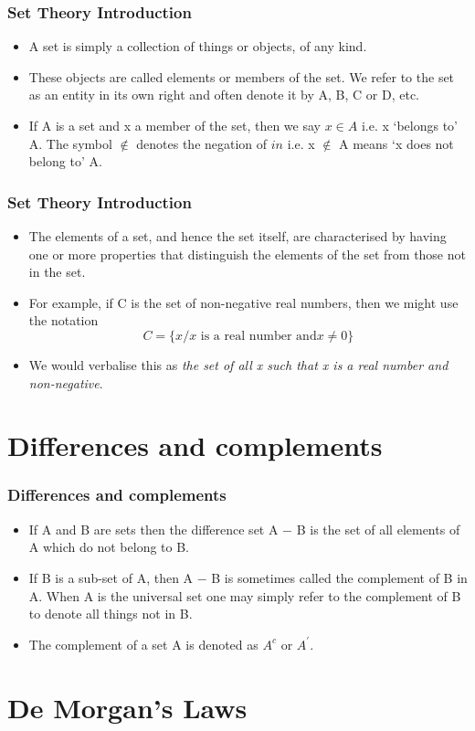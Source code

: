 \documentclass{beamer}
\begin{document}
\begin{frame}
\frametitle{Set Theory Introduction}
\Large
\begin{itemize}
\item A set is simply a collection of things or objects, of any kind. 
\item These objects
are called elements or members of the set. We refer to the set as an
entity in its own right and often denote it by A, B, C or D, etc.
\item 
If A is a set and x a member of the set, then we say $x \in A$ i.e. x ‘belongs to’
A. The symbol $\notin$ denotes the negation of $in$  i.e. x $\notin$ A means ‘x does not
belong to’ A.
\end{itemize}
\end{frame}
\begin{frame}
\frametitle{Set Theory Introduction}
\Large
\begin{itemize}
\item The elements of a set, and hence the set itself, are characterised by having
one or more properties that distinguish the elements of the set from those
not in the set. 
\item For example, if C is the set of non-negative real numbers, then we
might use the notation
\[C = \{x / x \mbox{ is a real number and} x \neq 0\}\]
\item We would verbalise this as \textit{the set of all x such that x is a real number and non-negative}.
\end{itemize}
\end{frame}

\section{Differences and complements}

\begin{frame}
\frametitle{Differences and complements}
\Large
\begin{itemize}
\item If A and B are sets then the difference set A − B is the set of all elements
of A which do not belong to B.
\item If B is a sub-set of A, then A − B is sometimes called the complement of
B in A. When A is the universal set one may simply refer to the
complement of B to denote all things not in B. \item The complement of a set A
is denoted as $A^c$ or $A^{\prime}$.
\end{itemize}
\end{frame}

\section{De Morgan's Laws}
\end{document}
